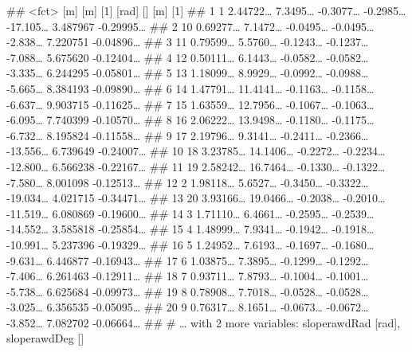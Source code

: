 \documentclass[11pt,]{article}
\newenvironment{Shaded}{\begin{snugshade}}{\end{snugshade}}
\newcommand{\NormalTok}[1]{#1}
\begin{document}
\begin{Shaded}
\begin{Highlighting}[]
\NormalTok{##    <fct>         [m]      [m]      [1]    [rad]      []      [m]       [1]}
\NormalTok{##  1 1        2.44722…  7.3495… -0.3077… -0.2985… -17.105… 3.487967 -0.29995…}
\NormalTok{##  2 10       0.69277…  7.1472… -0.0495… -0.0495…  -2.838… 7.220751 -0.04896…}
\NormalTok{##  3 11       0.79599…  5.5760… -0.1243… -0.1237…  -7.088… 5.675620 -0.12404…}
\NormalTok{##  4 12       0.50111…  6.1443… -0.0582… -0.0582…  -3.335… 6.244295 -0.05801…}
\NormalTok{##  5 13       1.18099…  8.9929… -0.0992… -0.0988…  -5.665… 8.384193 -0.09890…}
\NormalTok{##  6 14       1.47791… 11.4141… -0.1163… -0.1158…  -6.637… 9.903715 -0.11625…}
\NormalTok{##  7 15       1.63559… 12.7956… -0.1067… -0.1063…  -6.095… 7.740399 -0.10570…}
\NormalTok{##  8 16       2.06222… 13.9498… -0.1180… -0.1175…  -6.732… 8.195824 -0.11558…}
\NormalTok{##  9 17       2.19796…  9.3141… -0.2411… -0.2366… -13.556… 6.739649 -0.24007…}
\NormalTok{## 10 18       3.23785… 14.1406… -0.2272… -0.2234… -12.800… 6.566238 -0.22167…}
\NormalTok{## 11 19       2.58242… 16.7464… -0.1330… -0.1322…  -7.580… 8.001098 -0.12513…}
\NormalTok{## 12 2        1.98118…  5.6527… -0.3450… -0.3322… -19.034… 4.021715 -0.34471…}
\NormalTok{## 13 20       3.93166… 19.0466… -0.2038… -0.2010… -11.519… 6.080869 -0.19600…}
\NormalTok{## 14 3        1.71110…  6.4661… -0.2595… -0.2539… -14.552… 3.585818 -0.25854…}
\NormalTok{## 15 4        1.48999…  7.9341… -0.1942… -0.1918… -10.991… 5.237396 -0.19329…}
\NormalTok{## 16 5        1.24952…  7.6193… -0.1697… -0.1680…  -9.631… 6.446877 -0.16943…}
\NormalTok{## 17 6        1.03875…  7.3895… -0.1299… -0.1292…  -7.406… 6.261463 -0.12911…}
\NormalTok{## 18 7        0.93711…  7.8793… -0.1004… -0.1001…  -5.738… 6.625684 -0.09973…}
\NormalTok{## 19 8        0.78908…  7.7018… -0.0528… -0.0528…  -3.025… 6.356535 -0.05095…}
\NormalTok{## 20 9        0.76317…  8.1651… -0.0673… -0.0672…  -3.852… 7.082702 -0.06664…}
\NormalTok{## # … with 2 more variables: sloperawdRad [rad], sloperawdDeg []}


\end{Highlighting}
\end{Shaded}
\end{document}
